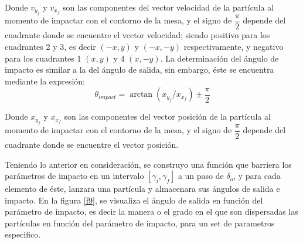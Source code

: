 \documentclass[11pt,letterpaper,twocolumn]{article}
\begin{document}
\par 
Donde $v_{y_{f}}$ y $v_{x_{f}}$ son las componentes del vector velocidad de la partícula al momento de impactar con el contorno de la mesa, y el signo de $\dfrac{\pi}{2}$ depende del cuadrante donde se encuentre el vector velocidad; siendo positivo para los cuadrantes 2 y 3, es decir $(-x,y)$ y $(-x,-y)$ respectivamente, y negativo para los cuadrantes 1 $(x,y)$ y 4 $(x,-y)$. La determinación del ángulo de impacto es similar a la del ángulo de salida, sin embargo, éste se encuentra mediante la expresión:
$$\theta_{impact}=\arctan(x_{y_{f}}/x_{x_{f}}) \pm \dfrac{\pi}{2}$$
\par 
Donde $x_{y_{f}}$ y $x_{x_{f}}$ son las componentes del vector posición de la partícula al momento de impactar con el contorno de la mesa, y el signo de $\dfrac{\pi}{2}$ depende del cuadrante donde se encuentre el vector posición.\\
\par 
Teniendo lo anterior en consideración, se construyo una función que barriera los parámetros de impacto en un intervalo $[\gamma_{i},\gamma_{f}]$ a un paso de $\delta_{o}$, y para cada elemento de éste, lanzara una partícula y almacenara sus ángulos de salida e impacto. En la figura \ref{f9}, se visualiza el ángulo de salida en función del parámetro de impacto, es decir la manera o el grado en el que son dispersadas las partículas en función del parámetro de impacto, para un set de parametros especifico.\\
  
\end{document}
